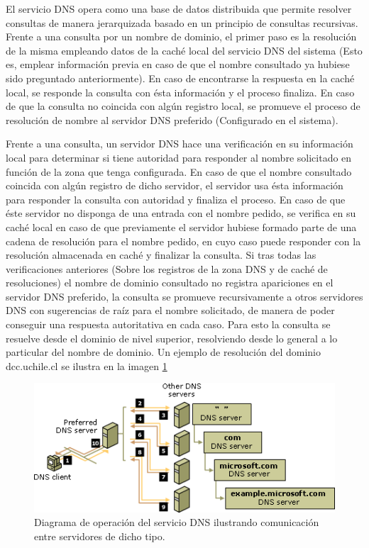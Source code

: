 El servicio DNS \cite{rfc:1034, rfc:1035} opera como una base de datos distribuida que permite resolver consultas de manera jerarquizada basado en un principio de consultas recursivas. Frente a una consulta por un nombre de dominio, el primer paso es la resolución de la misma empleando datos de la caché local del servicio DNS del sistema (Esto es, emplear información previa en caso de que el nombre consultado ya hubiese sido preguntado anteriormente). En caso de encontrarse la respuesta en la caché local, se responde la consulta con ésta información y el proceso finaliza. En caso de que la consulta no coincida con algún registro local, se promueve el proceso de resolución de nombre al servidor DNS preferido (Configurado en el sistema).  

Frente a una consulta, un servidor DNS hace una verificación en su información local para determinar si tiene autoridad para responder al nombre solicitado en función de la zona que tenga configurada. En caso de que el nombre consultado coincida con algún registro de dicho servidor, el servidor usa ésta información para responder la consulta con autoridad y finaliza el proceso. En caso de que éste servidor no disponga de una entrada con el nombre pedido, se verifica en su caché local en caso de que previamente el servidor hubiese formado parte de una cadena de resolución para el nombre pedido, en cuyo caso puede responder con la resolución almacenada en caché y finalizar la consulta. Si tras todas las verificaciones anteriores (Sobre los registros de la zona DNS y de caché de resoluciones) el nombre de dominio consultado no registra apariciones en el servidor DNS preferido, la consulta se promueve recursivamente a otros servidores DNS con sugerencias de raíz para el nombre solicitado, de manera de poder conseguir una respuesta autoritativa en cada caso. Para esto la consulta se resuelve desde el dominio de nivel superior, resolviendo desde lo general a lo particular del nombre de dominio. Un ejemplo de resolución del dominio dcc.uchile.cl se ilustra en la imagen \ref{fig:dns}

\begin{figure}[!h]
	\centering
	\includegraphics[scale=0.7]{imagenes/dns-system.png}
	\caption{Diagrama de operación del servicio DNS ilustrando comunicación entre servidores de dicho tipo.}
	\label{fig:dns}
\end{figure}

